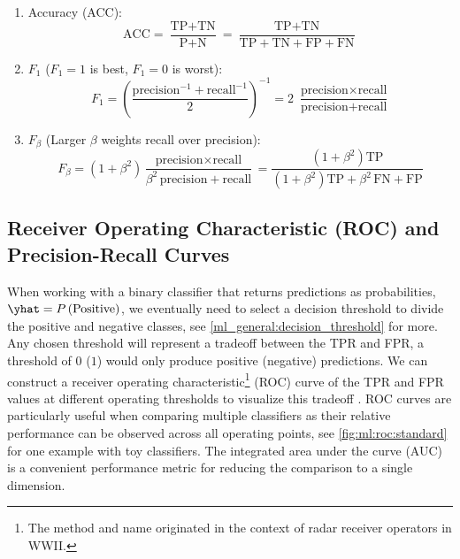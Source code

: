 \begin{enumerate}[noitemsep]
  \item Accuracy (ACC):
\begin{equation} \label{eq:ACC}
\text{ACC} = \frac{\text{TP}+\text{TN}}{\text{P}+\text{N}} = \frac{\text{TP}+\text{TN}}{\text{TP}+\text{TN}+\text{FP}+\text{FN}}
\end{equation}

  \item $F_{1}$ ($F_{1}=1$ is best, $F_{1}=0$ is worst):
\begin{equation} \label{eq:F1}
F_{1} = \left(\frac{\text{precision}^{-1}+\text{recall}^{-1}}{2}\right)^{-1} = 2\,\,\frac{\text{precision} \times \text{recall}}{\text{precision} + \text{recall}}
\end{equation}

  \item $F_{\beta}$ (Larger $\beta$ weights recall over precision):
\begin{equation} \label{eq:Fbeta}
F_{\beta} = \left(1+\beta^{2}\right) \frac{\text{precision} \times \text{recall}}{\beta^{2}\,\text{precision} + \text{recall}} =
\frac{\left(1+\beta^{2}\right) \text{TP}}{\left(1+\beta^{2}\right) \text{TP} + \beta^{2}\,\text{FN} + \text{FP}}
\end{equation}
\end{enumerate}

\subsection{Receiver Operating Characteristic (ROC) and Precision-Recall Curves}
\label{ml_general:eval:ROC}

When working with a binary classifier that returns predictions as probabilities, $\yhat = P\left(\text{Positive}\right)$,
we eventually need to select a decision threshold to divide the positive and negative classes,
see \cref{ml_general:decision_threshold} for more.
Any chosen threshold will represent a tradeoff between the TPR and FPR,
\eg a threshold of $\num{0}$ ($\num{1}$) would only produce positive (negative) predictions.
We can construct a receiver operating characteristic\footnote{The method and name originated in the context of radar receiver operators in WWII.} (ROC) curve
of the TPR and FPR values at different operating thresholds to visualize this tradeoff \cite{Fawcett2006861}.
ROC curves are particularly useful when comparing multiple classifiers
as their relative performance can be observed across all operating points,
see \cref{fig:ml:roc:standard} for one example with toy classifiers.
The integrated area under the curve (AUC) is a convenient performance metric for reducing the comparison to a single dimension.

